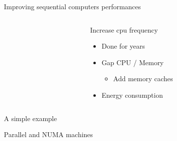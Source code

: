 \documentclass[xcolor={usenames,dvipsnames},hyperref={pdfusetitle}]{beamer}
\makeatletter
\newcommand{\alertitem}{\item<+-|alert@+>}
\makeatother
\begin{document}
\begin{frame}{Improving sequential computers performances}
    \begin{columns}
        \begin{column}{.45\textwidth}
            \centering
            
        \end{column}
        \begin{column}{.45\textwidth}
            \pause
            \begin{block}{Increase cpu frequency}
                \begin{itemize}[<+->]
                    \item Done for years
                    \alertitem Gap CPU / Memory
                    \begin{itemize}
                        \alertitem Add memory caches
                    \end{itemize}
                    \alertitem Energy consumption
                \end{itemize}
            \end{block}
        \end{column}
    \end{columns}
\end{frame}

\begin{frame}{A simple example}
    \centering
    \scalebox{.6}{
        
    }
\end{frame}

\begin{frame}{Parallel and NUMA machines}
    \centering
    \scalebox{.6}{
        
    }
    \pause
\end{frame}
\end{document}

